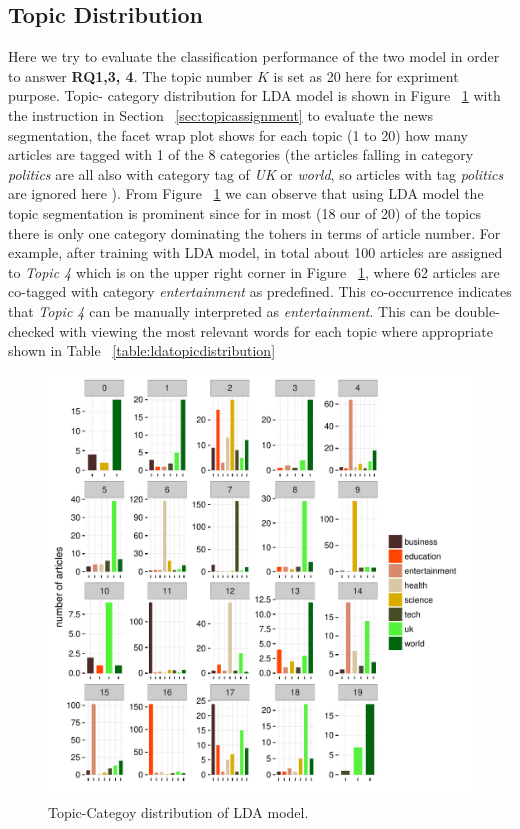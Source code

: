 \subsection{Topic Distribution}
Here we try to evaluate the classification performance of the two model in order to answer \textbf{RQ1,3, 4}. The topic number $K$ is set as 20 here for expriment purpose. Topic- category distribution for LDA model is shown in Figure ~\ref{fig:lda_with_weights} with the instruction in Section ~\ref{sec:topicassignment} to evaluate the news segmentation, the facet wrap plot shows for each topic (1 to 20) how many articles are tagged with 1 of the 8 categories (the articles falling in category \textit{politics} are all also with category tag of \textit{UK} or \textit{world}, so articles with tag \textit{politics} are ignored here  ). From Figure ~\ref{fig:lda_with_weights} we can observe that using LDA model the topic segmentation is prominent since for in most (18 our of 20) of the topics there is only one category dominating the tohers in terms of article number. For example, after training with LDA model, in total about 100 articles are assigned to \textit{Topic 4} which is on the upper right corner in Figure ~\ref{fig:lda_with_weights}, where 62 articles are co-tagged with category \textit{entertainment} as predefined. This co-occurrence indicates that \textit{Topic 4} can be manually interpreted as \textit{entertainment}. This can be double-checked with viewing the most relevant words for each topic where appropriate shown in Table ~\ref{table:ldatopicdistribution}
\begin{figure}[h]
\centering
\includegraphics[width=1\textwidth]{figures/lda_with_weights.pdf}
\caption{Topic-Categoy distribution of LDA model.}
\label{fig:lda_with_weights}
\end{figure}

